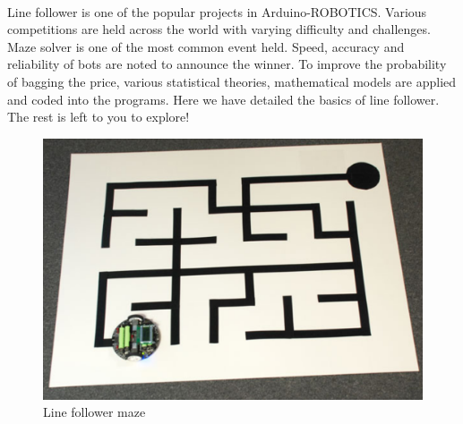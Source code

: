 \paragraph{ } Line follower is one of the popular projects in Arduino-ROBOTICS. Various competitions are held across the world with varying difficulty and challenges. Maze solver is one of the most common event held. Speed, accuracy and reliability of bots are noted to announce the winner. To improve the probability of bagging the price, various statistical theories, mathematical models are applied and coded into the programs. Here we have detailed the basics of line follower. The rest is left to you to explore!

\begin{figure}
    \centering
    \includegraphics{Images/IR Sensor/line_maze.png}
    \caption{Line follower maze}
\end{figure}